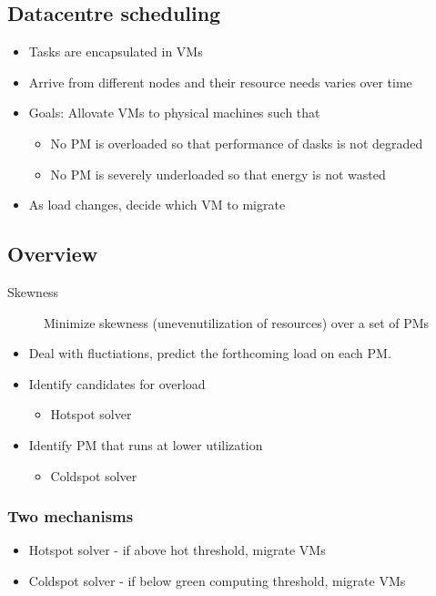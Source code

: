 \documentclass[course, english]{Notes}
\begin{document}
\subsection{Datacentre scheduling}
\begin{itemize}
	\item Tasks are encapsulated in VMs
	\item Arrive from different nodes and their resource needs varies over
		time
	\item Goals: Allovate VMs to physical machines such that
		\begin{itemize}
			\item No PM is overloaded so that performance of dasks
				is not degraded
			\item No PM is severely underloaded so that energy is
				not wasted
		\end{itemize}
	\item As load changes, decide which VM to migrate
\end{itemize}
\subsection{Overview}
\begin{description}
	\item[Skewness] Minimize skewness (unevenutilization of resources) over
		a set of PMs
\end{description}
\begin{itemize}
	\item Deal with fluctiations, predict the forthcoming load on each PM.
	\item Identify candidates for overload
		\begin{itemize}
			\item Hotspot solver
		\end{itemize}
	\item Identify PM that runs at lower utilization
		\begin{itemize}
			\item Coldspot solver
		\end{itemize}
\end{itemize}
\subsubsection{Two mechanisms}
\begin{itemize}
	\item Hotspot solver - if above hot threshold, migrate VMs
	\item Coldspot solver - if below green computing threshold, migrate VMs
\end{itemize}
\end{document}
